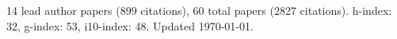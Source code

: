 14 lead author papers (899 citations),
60 total papers (2827 citations).\newline
h-index: 32, g-index: 53, i10-index: 48. Updated \today.